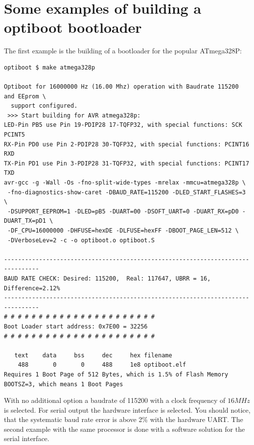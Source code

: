 \section{Some examples of building a optiboot bootloader}\label{Examples}

The first example is the building of a bootloader for the popular ATmega328P:

\begin{verbatim}
optiboot $ make atmega328p

Optiboot for 16000000 Hz (16.00 Mhz) operation with Baudrate 115200 and EEprom \
  support configured.
 >>> Start building for AVR atmega328p:
LED-Pin PB5 use Pin 19-PDIP28 17-TQFP32, with special functions: SCK PCINT5
RX-Pin PD0 use Pin 2-PDIP28 30-TQFP32, with special functions: PCINT16 RXD
TX-Pin PD1 use Pin 3-PDIP28 31-TQFP32, with special functions: PCINT17 TXD
avr-gcc -g -Wall -Os -fno-split-wide-types -mrelax -mmcu=atmega328p \
 -fno-diagnostics-show-caret -DBAUD_RATE=115200 -DLED_START_FLASHES=3 \
 -DSUPPORT_EEPROM=1 -DLED=pB5 -DUART=00 -DSOFT_UART=0 -DUART_RX=pD0 -DUART_TX=pD1 \
 -DF_CPU=16000000 -DHFUSE=hexDE -DLFUSE=hexFF -DBOOT_PAGE_LEN=512 \
 -DVerboseLev=2 -c -o optiboot.o optiboot.S

--------------------------------------------------------------------------------
BAUD RATE CHECK: Desired: 115200,  Real: 117647, UBRR = 16, Difference=2.12%
--------------------------------------------------------------------------------
# # # # # # # # # # # # # # # # # # # # # #
Boot Loader start address: 0x7E00 = 32256
# # # # # # # # # # # # # # # # # # # # # #

   text    data     bss     dec     hex filename
    488       0       0     488     1e8 optiboot.elf
Requires 1 Boot Page of 512 Bytes, which is 1.5% of Flash Memory
BOOTSZ=3, which means 1 Boot Pages

\end{verbatim}


With no additional option a baudrate of 115200 with a clock frequency of \(16 MHz\) is selected.
For serial output the hardware interface is selected.
You should notice, that the systematic baud rate error is above 2\% with the hardware UART.
The second example with the same processor is done with a software solution for the serial interface.

